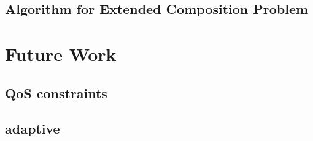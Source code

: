 \documentclass[senior,final,11pt]{iscs-thesis}
\begin{document}
\subsection{Algorithm for Extended Composition Problem}


\section{Future Work}
\subsection{QoS constraints}
\subsection{adaptive}
\end{document}
